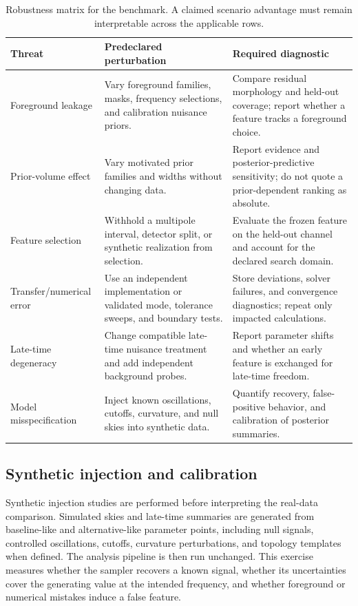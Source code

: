 \documentclass[10pt,conference]{IEEEtran}
\begin{document}
\begin{table}[!t]
\caption{Robustness matrix for the benchmark. A claimed scenario advantage must remain interpretable across the applicable rows.}
\label{tab:robustness-matrix}
\centering
\footnotesize
\begin{tabular}{p{}p{}p{}}
\toprule
Threat & Predeclared perturbation & Required diagnostic \\
\midrule
Foreground leakage & Vary foreground families, masks, frequency selections, and calibration nuisance priors. & Compare residual morphology and held-out coverage; report whether a feature tracks a foreground choice. \\
Prior-volume effect & Vary motivated prior families and widths without changing data. & Report evidence and posterior-predictive sensitivity; do not quote a prior-dependent ranking as absolute. \\
Feature selection & Withhold a multipole interval, detector split, or synthetic realization from selection. & Evaluate the frozen feature on the held-out channel and account for the declared search domain. \\
Transfer/numerical error & Use an independent implementation or validated mode, tolerance sweeps, and boundary tests. & Store deviations, solver failures, and convergence diagnostics; repeat only impacted calculations. \\
Late-time degeneracy & Change compatible late-time nuisance treatment and add independent background probes. & Report parameter shifts and whether an early feature is exchanged for late-time freedom. \\
Model misspecification & Inject known oscillations, cutoffs, curvature, and null skies into synthetic data. & Quantify recovery, false-positive behavior, and calibration of posterior summaries. \\
\bottomrule
\end{tabular}
\end{table}

\subsection{Synthetic injection and calibration}

Synthetic injection studies are performed before interpreting the real-data comparison. Simulated skies and late-time summaries are generated from baseline-like and alternative-like parameter points, including null signals, controlled oscillations, cutoffs, curvature perturbations, and topology templates when defined. The analysis pipeline is then run unchanged. This exercise measures whether the sampler recovers a known signal, whether its uncertainties cover the generating value at the intended frequency, and whether foreground or numerical mistakes induce a false feature.
\end{document}
